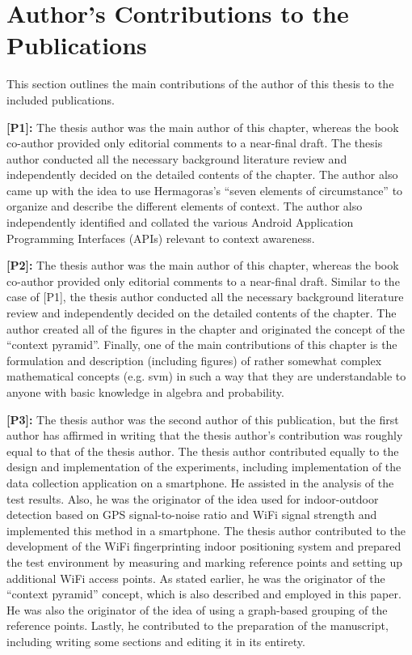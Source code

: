 \section{Author's Contributions to the Publications}
\label{sec:author_contributions}

This section outlines the main contributions of the author of this thesis to the included publications.

\textbf{[P1]:} The thesis author was the main author of this chapter, whereas the book co-author provided only editorial comments to a near-final draft. The thesis author conducted all the necessary background literature review and independently decided on the detailed contents of the chapter. The author also came up with the idea to use Hermagoras's ``seven elements of circumstance'' to organize and describe the different elements of context. The author also independently identified and collated the various Android Application Programming Interfaces (APIs) relevant to context awareness.

\textbf{[P2]:} The thesis author was the main author of this chapter, whereas the book co-author provided only editorial comments to a near-final draft. Similar to the case of [P1], the thesis author conducted all the necessary background literature review and independently decided on the detailed contents of the chapter. The author created all of the figures in the chapter and originated the concept of the ``context pyramid''. Finally, one of the main contributions of this chapter is the formulation and description (including figures) of rather somewhat complex mathematical concepts (e.g. \acrlong{svm}) in such a way that they are understandable to anyone with basic knowledge in algebra and probability.

\textbf{[P3]:} The thesis author was the second author of this publication, but the first author has affirmed in writing that the thesis author's contribution was roughly equal to that of the thesis author. The thesis author contributed equally to the design and implementation of the experiments, including implementation of the data collection application on a smartphone. He assisted in the analysis of the test results. Also, he was the originator of the idea used for indoor-outdoor detection based on GPS signal-to-noise ratio and WiFi signal strength and implemented this method in a smartphone. The thesis author contributed to the development of the WiFi fingerprinting indoor positioning system and prepared the test environment by measuring and marking reference points and setting up additional WiFi access points. As stated earlier, he was the originator of the ``context pyramid'' concept, which is also described and employed in this paper. He was also the originator of the idea of using a graph-based grouping of the reference points. Lastly, he contributed to the preparation of the manuscript, including writing some sections and editing it in its entirety.

